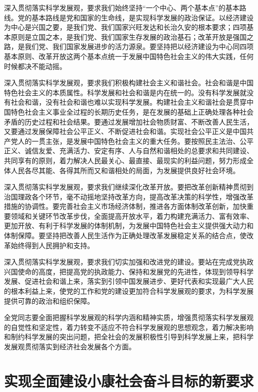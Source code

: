深入贯彻落实科学发展观，要求我们始终坚持“一个中心、两个基本点”的基本路线。党的基本路线是党和国家的生命线，是实现科学发展的政治保证。以经济建设为中心是兴国之要，是我们党、我们国家兴旺发达和长治久安的根本要求；四项基本原则是立国之本，是我们党、我们国家生存发展的政治基石；改革开放是强国之路，是我们党、我们国家发展进步的活力源泉。要坚持把以经济建设为中心同四项基本原则、改革开放这两个基本点统一于发展中国特色社会主义的伟大实践，任何时候都决不能动摇。

深入贯彻落实科学发展观，要求我们积极构建社会主义和谐社会。社会和谐是中国特色社会主义的本质属性。科学发展和社会和谐是内在统一的。没有科学发展就没有社会和谐，没有社会和谐也难以实现科学发展。构建社会主义和谐社会是贯穿中国特色社会主义事业全过程的长期历史任务，是在发展的基础上正确处理各种社会矛盾的历史过程和社会结果。要通过发展增加社会物质财富、不断改善人民生活，又要通过发展保障社会公平正义、不断促进社会和谐。实现社会公平正义是中国共产党人的一贯主张，是发展中国特色社会主义的重大任务。要按照民主法治、公平正义、诚信友爱、充满活力、安定有序、人与自然和谐相处的总要求和共同建设、共同享有的原则，着力解决人民最关心、最直接、最现实的利益问题，努力形成全体人民各尽其能、各得其所而又和谐相处的局面，为发展提供良好社会环境。

深入贯彻落实科学发展观，要求我们继续深化改革开放。要把改革创新精神贯彻到治国理政各个环节，毫不动摇地坚持改革方向，提高改革决策的科学性，增强改革措施的协调性。要完善社会主义市场经济体制，推进各方面体制改革创新，加快重要领域和关键环节改革步伐，全面提高开放水平，着力构建充满活力、富有效率、更加开放、有利于科学发展的体制机制，为发展中国特色社会主义提供强大动力和体制保障。要坚持把改善人民生活作为正确处理改革发展稳定关系的结合点，使改革始终得到人民拥护和支持。

深入贯彻落实科学发展观，要求我们切实加强和改进党的建设。要站在完成党执政兴国使命的高度，把提高党的执政能力、保持和发展党的先进性，体现到领导科学发展、促进社会和谐上来，落实到引领中国发展进步、更好代表和实现最广大人民的根本利益上来，使党的工作和党的建设更加符合科学发展观的要求，为科学发展提供可靠的政治和组织保障。

全党同志要全面把握科学发展观的科学内涵和精神实质，增强贯彻落实科学发展观的自觉性和坚定性，着力转变不适应不符合科学发展观的思想观念，着力解决影响和制约科学发展的突出问题，把全社会的发展积极性引导到科学发展上来，把科学发展观贯彻落实到经济社会发展各个方面。

\section{实现全面建设小康社会奋斗目标的新要求}

